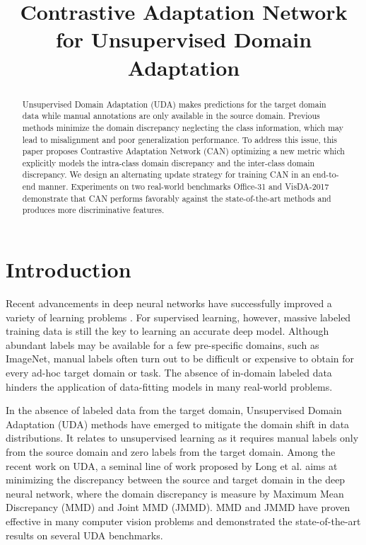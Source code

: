 \documentclass[conference]{IEEEtran}
\begin{document}
\title{Contrastive Adaptation Network for Unsupervised Domain Adaptation}

\author{
}

\maketitle

\begin{abstract}
Unsupervised Domain Adaptation (UDA) makes predictions for the target domain data while manual annotations are only available in the source domain.
Previous methods minimize the domain discrepancy neglecting the class information, which may lead to misalignment and poor generalization performance.
To address this issue, this paper proposes Contrastive Adaptation Network (CAN) optimizing a new metric which explicitly models the intra-class domain discrepancy and the inter-class domain discrepancy.
We design an alternating update strategy for training CAN in an end-to-end manner. Experiments on two real-world benchmarks Office-31 and VisDA-2017 demonstrate that CAN performs favorably against the state-of-the-art methods and produces more discriminative features.
\end{abstract}

\section{Introduction}
Recent advancements in deep neural networks have successfully improved a variety of learning problems \cite{b1}.
For supervised learning, however, massive labeled training data is still the key to learning an accurate deep model.
Although abundant labels may be available for a few pre-specific domains, such as ImageNet, manual labels often turn out to be difficult or expensive to obtain for every ad-hoc target domain or task.
The absence of in-domain labeled data hinders the application of data-fitting models in many real-world problems.

In the absence of labeled data from the target domain, Unsupervised Domain Adaptation (UDA) methods have emerged to mitigate the domain shift in data distributions.
It relates to unsupervised learning as it requires manual labels only from the source domain and zero labels from the target domain.
Among the recent work on UDA, a seminal line of work proposed by Long et al. aims at minimizing the discrepancy between the source and target domain in the deep neural network, where the domain discrepancy is measure by 
Maximum Mean Discrepancy (MMD) and Joint MMD (JMMD). MMD and JMMD have proven effective in many computer vision problems and demonstrated the state-of-the-art results on several UDA benchmarks.
\end{document}

